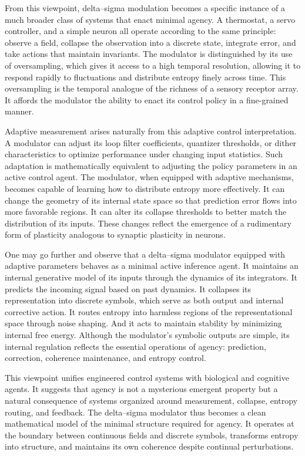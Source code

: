 From this viewpoint, delta–sigma modulation becomes a specific instance of a much broader class of systems that enact minimal agency. A thermostat, a servo controller, and a simple neuron all operate according to the same principle: observe a field, collapse the observation into a discrete state, integrate error, and take actions that maintain invariants. The modulator is distinguished by its use of oversampling, which gives it access to a high temporal resolution, allowing it to respond rapidly to fluctuations and distribute entropy finely across time. This oversampling is the temporal analogue of the richness of a sensory receptor array. It affords the modulator the ability to enact its control policy in a fine-grained manner.

Adaptive measurement arises naturally from this adaptive control interpretation. A modulator can adjust its loop filter coefficients, quantizer thresholds, or dither characteristics to optimize performance under changing input statistics. Such adaptation is mathematically equivalent to adjusting the policy parameters in an active control agent. The modulator, when equipped with adaptive mechanisms, becomes capable of learning how to distribute entropy more effectively. It can change the geometry of its internal state space so that prediction error flows into more favorable regions. It can alter its collapse thresholds to better match the distribution of its inputs. These changes reflect the emergence of a rudimentary form of plasticity analogous to synaptic plasticity in neurons.

One may go further and observe that a delta–sigma modulator equipped with adaptive parameters behaves as a minimal active inference agent. It maintains an internal generative model of its inputs through the dynamics of its integrators. It predicts the incoming signal based on past dynamics. It collapses its representation into discrete symbols, which serve as both output and internal corrective action. It routes entropy into harmless regions of the representational space through noise shaping. And it acts to maintain stability by minimizing internal free energy. Although the modulator’s symbolic outputs are simple, its internal regulation reflects the essential operations of agency: prediction, correction, coherence maintenance, and entropy control.

This viewpoint unifies engineered control systems with biological and cognitive agents. It suggests that agency is not a mysterious emergent property but a natural consequence of systems organized around measurement, collapse, entropy routing, and feedback. The delta–sigma modulator thus becomes a clean mathematical model of the minimal structure required for agency. It operates at the boundary between continuous fields and discrete symbols, transforms entropy into structure, and maintains its own coherence despite continual perturbations.

